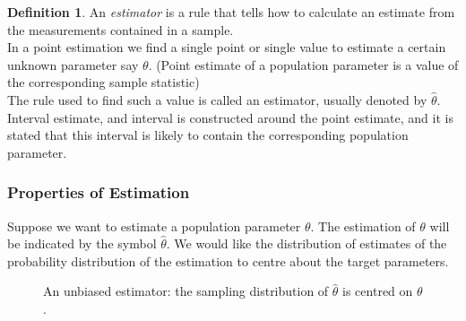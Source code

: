 \documentclass[11pt,a4paper]{article}
\theoremstyle{definition}
\newtheorem{definition}[thm]{Definition}
\begin{document}
\begin{definition}
An \emph{estimator} is a rule that tells how to calculate an estimate from the measurements contained in a sample.\\

In a point estimation we find a single point or single value to estimate a certain unknown parameter say $\theta$. (Point estimate of a population parameter is a value of the corresponding sample statistic)\\

The rule used to find such a value is called an estimator, usually denoted by $\hat{\theta}$.\\

Interval estimate, and interval is constructed around the point estimate, and it is stated that this interval is likely to contain the corresponding population parameter.\\
\end{definition}







\subsubsection{Properties of Estimation}
Suppose we want to estimate a population parameter $\theta$. The estimation of $\theta$ will be indicated by the symbol $\hat{\theta}$. We would like the distribution of estimates of the probability distribution of the estimation to centre about the target parameters.





\begin{figure}[H]
\centering
{}
\caption{An unbiased estimator: the sampling distribution of $\hat{\theta}$ is centred on $\theta$.}
\end{figure}
\end{document}
